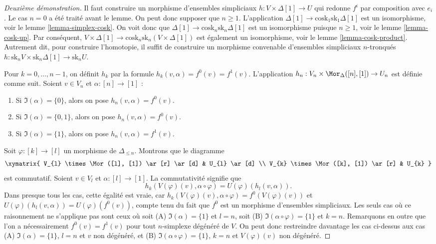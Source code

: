\begin{proof}[Deuxième démonstration]
Il faut construire un morphisme d'ensembles simpliciaux
$h : V \times \Delta[1] \to U$ qui redonne $f^i$ par composition avec $e_i$.
Le cas $n = 0$ a été traité avant le lemme.
On peut donc supposer que $n \geq 1$.
L'application $\Delta[1] \to \text{cosk}_1 \text{sk}_1 \Delta[1]$
est un isomorphisme, voir le lemme \ref{lemma-simplex-cosk}.
On voit donc que $\Delta[1] \to \text{cosk}_n \text{sk}_n \Delta[1]$
est un isomorphisme puisque $n \geq 1$, voir le
lemme \ref{lemma-cosk-up}. Par conséquent, $V \times \Delta[1] \to
\text{cosk}_n \text{sk}_n (V \times \Delta[1])$
est également un isomorphisme, voir le lemme \ref{lemma-cosk-product}.
Autrement dit, pour construire l'homotopie, il suffit de construire un
morphisme convenable d'ensembles simpliciaux $n$-tronqués
$h : \text{sk}_n V \times \text{sk}_n \Delta[1] \to \text{sk}_n U$.

\medskip\noindent
Pour $k = 0, \ldots, n - 1$, on définit $h_k$ par la
formule $h_k(v, \alpha) = f^0(v) = f^1(v)$.
L'application $h_n : V_n \times \Mor_{\Delta}([n], [1]) \to U_n$
est définie comme suit. Soient $v \in V_n$ et $\alpha : [n] \to [1]$ :
\begin{enumerate}
\item Si $\Im(\alpha) = \{0\}$, alors on pose $h_n(v, \alpha) = f^0(v)$.
\item Si $\Im(\alpha) = \{0, 1\}$, alors on pose $h_n(v, \alpha) = f^0(v)$.
\item Si $\Im(\alpha) = \{1\}$, alors on pose $h_n(v, \alpha) = f^1(v)$.
\end{enumerate}
Soit $\varphi : [k] \to [l]$ un morphisme de $\Delta_{\leq n}$.
Montrons que le diagramme
$$
\xymatrix{
V_{l} \times \Mor([l], [1]) \ar[r] \ar[d] & U_{l} \ar[d] \\
V_{k} \times \Mor([k], [1]) \ar[r] & U_{k}
}
$$
est commutatif.
Soient $v \in V_{l}$ et $\alpha : [l] \to [1]$.
La commutativité signifie que
$$
h_k(V(\varphi)(v), \alpha \circ \varphi)
=
U(\varphi)(h_l(v, \alpha)).
$$
Dans presque tous les cas, cette égalité est vraie, car
$h_k(V(\varphi)(v), \alpha \circ \varphi) = f^0(V(\varphi)(v))$
et $U(\varphi)(h_l(v, \alpha)) = U(\varphi)(f^0(v))$, compte tenu du fait
que $f^0$ est un morphisme d'ensembles simpliciaux.
Les seuls cas où ce raisonnement ne s'applique pas sont ceux où
soit (A) $\Im(\alpha) = \{1\}$ et $l = n$,
soit (B) $\Im(\alpha \circ \varphi) = \{1\}$ et $k = n$.
Remarquons en outre que l'on a nécessairement $f^0(v) = f^1(v)$
pour tout $n$-simplexe dégénéré de $V$.
On peut donc restreindre davantage les cas ci-dessus aux cas
(A) $\Im(\alpha) = \{1\}$, $l = n$ et $v$ non dégénéré, et
(B) $\Im(\alpha \circ \varphi) = \{1\}$, $k = n$ et
$V(\varphi)(v)$ non dégénéré.


\end{proof}
